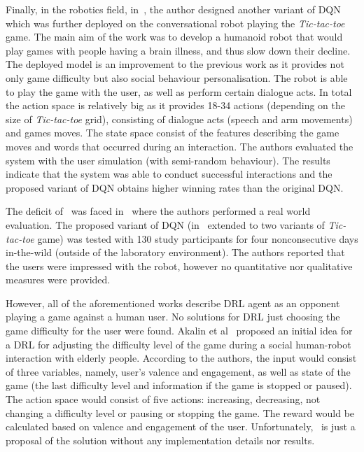 \documentclass[thesis]{mas_proposal}
\begin{document}
Finally, in the robotics field, in~\cite{Cuayahuitl2017}, the author designed another variant of DQN which was further deployed on the conversational robot playing the \emph{Tic-tac-toe} game. The main aim of the work was to develop a humanoid robot that would play games with people having a brain illness, and thus slow down their decline. The deployed model is an improvement to the previous work as it provides not only game difficulty but also social behaviour personalisation. The robot is able to play the game with the user, as well as perform certain dialogue acts. In total the action space is relatively big as it provides 18-34 actions (depending on the size of \emph{Tic-tac-toe} grid), consisting of dialogue acts (speech and arm movements) and games moves. The state space consist of the features describing the game moves and words that occurred during an interaction. The authors evaluated the system with the user simulation (with semi-random behaviour). The results indicate that the system was able to conduct successful interactions and the proposed variant of DQN obtains higher winning rates than the original DQN.

The deficit of~\cite{Cuayahuitl2017} was faced in~\cite{Cuayahuitl2020} where the authors performed a real world evaluation. The proposed variant of DQN (in~\cite{Cuayahuitl2020} extended to two variants of \emph{Tic-tac-toe} game) was tested with 130 study participants for four nonconsecutive days in-the-wild (outside of the laboratory environment). The authors reported that the users were impressed  with the robot, however no quantitative nor qualitative measures were provided.

However, all of the aforementioned works describe DRL agent as an opponent playing a game against a human user. No solutions for DRL just choosing the game difficulty for the user were found. Akalin et al~\cite{Akalin2018} proposed an initial idea for a DRL for adjusting the difficulty level of the game during a social human-robot interaction with elderly people. According to the authors, the input would consist of three variables, namely, user's valence and engagement, as well as state of the game (the last difficulty level and information if the game is stopped or paused). The action space would consist of five actions: increasing, decreasing, not changing a difficulty level or pausing or stopping the game. The reward would be calculated based on valence and engagement of the user. Unfortunately,~\cite{Akalin2018} is just a proposal of the solution without any implementation details nor results. 
\end{document}
